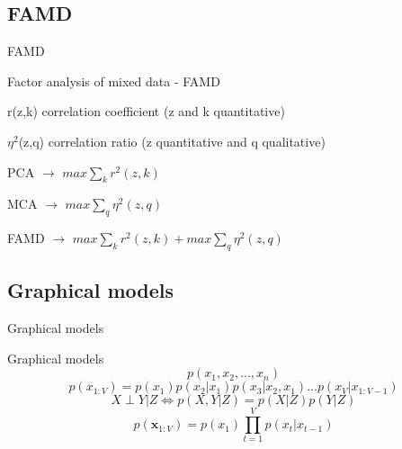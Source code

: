 \documentclass{beamer}
\begin{document}
\subsection{FAMD}
\begin{frame}{}
\begin{center}
{\Huge FAMD}
\end{center}
\end{frame}

\begin{frame}{Factor analysis of mixed data - FAMD}
\begin{center}
r(z,k) correlation coefficient (z and k quantitative) \\
\end{center}
\begin{center}
$\eta^{2}$(z,q) correlation ratio (z quantitative and q qualitative)
\end{center}
\begin{center}
PCA $\rightarrow$ $max\sum_{k}r^{2}(z,k)$
\end{center}
\begin{center}
MCA $\rightarrow$ $max\sum_{q}\eta^{2}(z,q)$
\end{center}
\begin{center}
FAMD $\rightarrow$ $max\sum_{k}r^{2}(z,k)+max\sum_{q}\eta^{2}(z,q)$
\end{center}
\end{frame}




\subsection{Graphical models}
\begin{frame}{}
\begin{center}
{\Huge Graphical models}
\end{center}
\end{frame}

\begin{frame}{Graphical models}
\begin{equation}
p(x_{1},x_{2},...,x_{n})
\end{equation}
\begin{equation}
p(x_{1:V})=p(x_{1})p(x_{2}|x_{1})p(x_{3}|x_{2},x_{1})...p(x_{V}|x_{1:V-1})
\end{equation}
\begin{equation}
X  \perp Y| Z \iff  p(X,Y|Z) = p(X|Z)p(Y|Z)
\end{equation}
\begin{equation}
p(\textbf{x}_{1:V})=p(x_{1})\prod^{V}_{t=1}p(x_{t}|x_{t-1})
\end{equation}
\end{frame}
\end{document}
